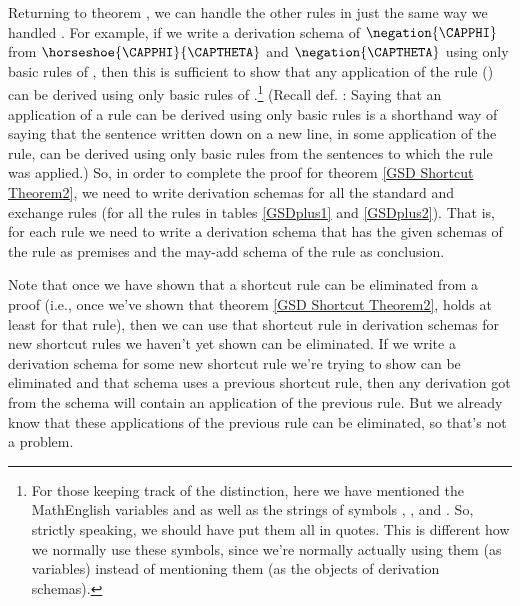 Returning to theorem , we can handle the other rules in just the same way we handled . 
For example, if we write a derivation schema of $\negation{\CAPPHI}$ from $\horseshoe{\CAPPHI}{\CAPTHETA}$ and $\negation{\CAPTHETA}$ using only basic rules of \GSD{}, then this is sufficient to show that any application of the rule  () can be derived using only basic rules of \GSD{}.\footnote{For
those keeping track of the  distinction, here we have mentioned the MathEnglish variables \mention{$\CAPPHI$} and \mention{$\CAPTHETA$} as well as the strings of symbols \mention{$\negation{\CAPPHI}$}, \mention{$\horseshoe{\CAPPHI}{\CAPTHETA}$}, and \mention{$\negation{\CAPTHETA}$}. 
So, strictly speaking, we should have put them all in quotes.
This is different how we normally use these symbols, since we're normally actually using them (as variables) instead of mentioning them (as the objects of derivation schemas).}
(Recall def. : Saying that an application of a rule can be derived using only basic rules is a shorthand way of saying that the sentence written down on a new line, in some application of the rule, can be derived using only basic rules from the sentences to which the rule was applied.)
So, in order to complete the proof for theorem \ref{GSD Shortcut Theorem2}, we need to write derivation schemas for all the standard and exchange rules (for all the rules in tables \ref{GSDplus1} and \ref{GSDplus2}).
That is, for each rule we need to write a derivation schema that has the given schemas of the rule as premises and the may-add schema of the rule as conclusion. 

Note that once we have shown that a shortcut rule can be eliminated from a proof (i.e., once we've shown that theorem \ref{GSD Shortcut Theorem2}, holds at least for that rule), then we can use that shortcut rule in derivation schemas for new shortcut rules we haven't yet shown can be eliminated. 
If we write a derivation schema for some new shortcut rule we're trying to show can be eliminated and that schema uses a previous shortcut rule, then any derivation got from the schema will contain an application of the previous rule.
But we already know that these applications of the previous rule can be eliminated, so that's not a problem.  

